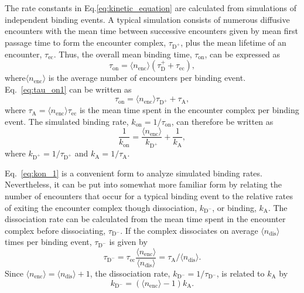 \documentclass[../talant.diss.submit.tex]{subfiles}
\begin{document}
The rate constants in Eq.\ref{eq:kinetic_equation} are calculated from
simulations of independent binding events. A typical simulation consists of
numerous diffusive encounters with the mean time between successive encounters
given by mean first passage time to form the encounter complex,
$\tau_{\mathrm{D}^+}$, plus the mean lifetime of an encounter,
$\tau_\mathrm{ec}$.  Thus, the overall mean binding time, $\tau_{\mathrm{on}}$,
can be expressed as
\begin{equation}
  \tau_\mathrm{on}= \langle n_\mathrm{enc}\rangle \left(\tau_{\mathrm{D}}^{+}+ \tau_\mathrm{ec}\right),
  \label{eq:tau_on1}
\end{equation}
where$\langle n_\mathrm{enc}\rangle$ is the average number of encounters per
binding event. Eq.~\ref{eq:tau_on1} can be written as
\begin{equation}
  \tau_\mathrm{on} = \langle n_\mathrm{enc}\rangle \tau_{\mathrm{D}^+}  + \tau_\mathrm{A},
  \label{eq:tau_on2}
\end{equation}
where $\tau_\mathrm{A} = \langle n_\mathrm{enc}\rangle \tau_{\mathrm{ec}}$ is
the mean time spent in the encounter complex per binding event. The simulated
binding rate, $k_\mathrm{on} = 1/\tau_{\mathrm{on}}$, can therefore be written
as
\begin{equation}
  \label{eq:kon_1}
  \frac{1}{k_{\mathrm{on}}} = \frac{\langle n_{\mathrm{enc}} \rangle}{k_{\mathrm{D}^+}} + \frac{1}{k_{\mathrm{A}}},
\end{equation}
where $k_{\mathrm{D}^+} = 1/\tau_{\mathrm{D}^+}$ and $k_\mathrm{A} = 1/\tau_{\mathrm{A}}$.

Eq.~\ref{eq:kon_1} is a convenient form to analyze simulated binding rates. Nevertheless,
it can be put into somewhat more familiar form by relating the number of encounters
that occur for a typical binding event to the relative rates of exiting the encounter complex
though dissociation, $k_{\mathrm{D}^-}$, or binding, $k_{\mathrm{A}}$.
The dissociation rate can be calculated from the 
mean time spent in the encounter complex before dissociating, $\tau_{\mathrm{D}^-}$. 
If the complex dissociates on average $\langle n_{\mathrm{dis}}\rangle$ times per binding event,
$\tau_{\mathrm{D}^-}$ is given by
\begin{equation}
  \label{eq:tau_dminus}
  \tau_{\mathrm{D}^-} = \tau_{\mathrm{ec}}\frac{\langle n_\mathrm{enc}\rangle}{\langle n_\mathrm{dis}\rangle}
  = \tau_{\mathrm{A}}/\langle n_\mathrm{dis}\rangle.
\end{equation}
Since $\langle n_{\mathrm{enc}}\rangle = \langle n_{\mathrm{dis}}\rangle + 1$,
the dissociation rate, $k_{\mathrm{D}^-} = 1/\tau_{\mathrm{D}^-}$, is related to
$k_\mathrm{A}$ by
\begin{equation}
  \label{eq:n_enc}
  k_{\mathrm{D}^-} = \left( \langle n_{\mathrm{enc}} \rangle - 1 \right) k_{\mathrm{A}}.
\end{equation}
\end{document}
